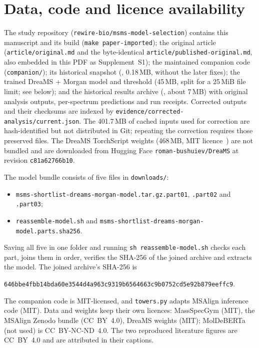 \documentclass[11pt]{article}
\newcommand{\m}[1]{\texttt{#1}}
\begin{document}
\section{Data, code and licence availability}\label{sec:availability}
The study repository (\texttt{rewire-bio/msms-model-selection}) contains this manuscript and its build (\texttt{make
paper-imported}); the original article (\texttt{article/original.md} and the byte-identical
\texttt{article/published-original.md}, also embedded in this PDF as Supplement~S1); the maintained companion code (\texttt{companion/}); its historical snapshot
(, 0.18\,MB, without the later fixes); the trained DreaMS + Morgan model and threshold
(45\,MB, split for a 25\,MiB file limit; see below); and the historical results archive (, about 7\,MB) with
original analysis outputs, per-spectrum predictions and run receipts. Corrected outputs and their checksums are indexed
by \m{evidence/corrected-analysis/current.json}. The 401.7\,MB of cached inputs used for correction are hash-identified
but not distributed in Git; repeating the correction requires those preserved files. The DreaMS TorchScript weights (468\,MB, MIT
licence~\citep{dreams_card}) are not bundled and are downloaded from Hugging Face \m{roman-bushuiev/DreaMS} at revision
\m{c81a62766b10}.

The model bundle consists of five files in \m{downloads/}:
\begin{itemize}\small
\item \m{msms-shortlist-dreams-morgan-model.tar.gz.part01}, \m{.part02} and \m{.part03};
\item \m{reassemble-model.sh} and \m{msms-shortlist-dreams-morgan-model.parts.sha256}.
\end{itemize}
Saving all five in one folder and running \m{sh reassemble-model.sh} checks each part, joins them in order, verifies the SHA-256
of the joined archive and extracts the model. The joined archive's SHA-256 is
\begin{center}\footnotesize\m{646bbe4fbb14bda60e3544d4a963c9319b6564663c9b0752cd5e92b879eeffc9}.\end{center} The companion code is
MIT-licensed, and \m{towers.py} adapts MSAlign inference code (MIT). Data and weights keep their own licences: MassSpecGym
(MIT), the MSAlign Zenodo bundle (CC~BY~4.0), DreaMS weights (MIT); MolDeBERTa (not used) is CC~BY-NC-ND~4.0. The two
reproduced literature figures are CC~BY~4.0 and are attributed in their captions.
\end{document}

